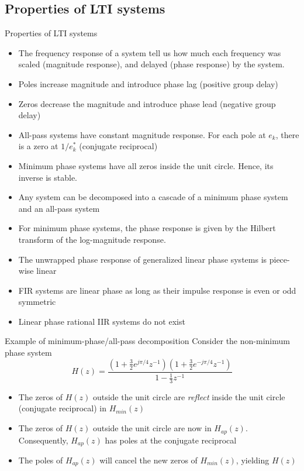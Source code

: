 \documentclass[10pt]{beamer}
\begin{document}
\subsection{Properties of LTI systems}
\begin{frame}{Properties of LTI systems}
\begin{itemize}
	\item The frequency response of a system tell us how much each frequency was scaled (magnitude response), and delayed (phase response) by the system.
	\item Poles increase magnitude and introduce phase lag (positive group delay)
	\item Zeros decrease the magnitude and introduce phase lead (negative group delay)
	\item All-pass systems have constant magnitude response. For each pole at $e_k$, there is  a zero at $1/e^*_k$ (conjugate reciprocal)
	\item Minimum phase systems have all zeros inside the unit circle. Hence, its inverse is stable.
	\item Any system can be decomposed into a cascade of a minimum phase system and an all-pass system
	\item For minimum phase systems, the phase response is given by the Hilbert transform of the log-magnitude response. 
	\item The unwrapped phase response of generalized linear phase systems is piece-wise linear
	\item FIR systems are linear phase as long as their impulse response is even or odd symmetric
	\item Linear phase rational IIR systems do not exist
\end{itemize}
\end{frame}

\begin{frame}{Example of minimum-phase/all-pass decomposition}
Consider the non-minimum phase system
\begin{equation*}
H(z) = \frac{(1 + \frac{3}{2}e^{j\pi/4}z^{-1})(1 + \frac{3}{2}e^{-j\pi/4}z^{-1})}{1 - \frac{1}{3}z^{-1}}
\end{equation*}

\hspace*{-0.85cm}\resizebox{0.95\paperwidth}{!}{}
\begin{itemize}
	\item The zeros of $H(z)$ outside the unit circle are \textit{reflect} inside the unit circle (conjugate reciprocal) in $H_{min}(z)$
	\item The zeros of $H(z)$ outside the unit circle are now in $H_{ap}(z)$. Consequently, $H_{ap}(z)$ has poles at the conjugate reciprocal
	\item The poles of $H_{ap}(z)$ will cancel the new zeros of $H_{min}(z)$, yielding $H(z)$
\end{itemize}
\end{frame}
\end{document}
